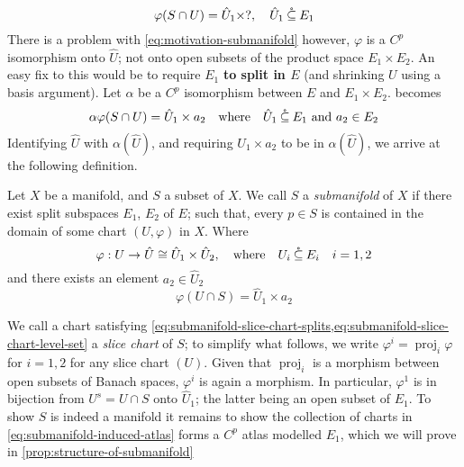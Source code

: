 \documentclass[../main-manifolds.tex]{subfiles}
\begin{document}
\begin{equation}\label{eq:motivation-submanifold}
    \varphi(S\cap U) = \hat{U}_1\times ?,\quad \hat{U}_1\:\mathring{\subseteq}\: E_1
\end{equation}
There is a problem with \cref{eq:motivation-submanifold} however, $\varphi$ is a $C^p$ isomorphism onto $\hat{U}$; not onto open subsets of the product space $E_1\times E_2$. An easy fix to this would be to require $E_1$ \textbf{to split in $E$} (and shrinking $U$ using a basis argument). Let $\alpha$ be a $C^p$ isomorphism between $E$ and $E_1\times E_2$.  becomes
\begin{equation}\label{eq:motivation-submanifold-modified}
    \alpha\varphi(S\cap U) = \hat{U}_1\times a_2\qqtext{where} \hat{U}_1\osub E_1 \text{ and }a_2\in E_2
\end{equation}
Identifying $\hat{U}$ with $\alpha(\hat{U})$, and requiring $U_1\times a_2$ to be in $\alpha(\hat{U})$, we arrive at the following definition.
\begin{definition}[Submanifold]
    Let $X$ be a manifold, and $S$ a subset of $X$. We call $S$ a \emph{submanifold} of $X$ if there exist split subspaces $E_1$, $E_2$ of $E$; such that, every $p\in S$ is contained in the domain of some chart $(U,\varphi)$ in $X$. Where
    \begin{equation}\label{eq:submanifold-slice-chart-splits}
        \varphi: U\to \hat{U}\cong \hat{U}_1\times \hat{U}_2,\qqtext{where} U_i\osub E_i\quad i=1,2
    \end{equation}
    and there exists an element $a_2\in \hat{U}_2$
    \begin{equation}\label{eq:submanifold-slice-chart-level-set}
        \varphi(U\cap S) = \hat{U}_1\times a_2
    \end{equation}
\end{definition}
We call a chart satisfying \cref{eq:submanifold-slice-chart-splits,eq:submanifold-slice-chart-level-set} a \emph{slice chart} of $S$; to simplify what follows, we write $\varphi^i = \operatorname{proj}_i\varphi$ for $i = 1,2$ for any slice chart $(U)$. Given that $\operatorname{proj}_i$ is a morphism between open subsets of Banach spaces, $\varphi^i$ is again a morphism. In particular, $\varphi^1$ is in bijection from $U^s=U\cap S$ onto $\hat{U}_1$; the latter being an open subset of $E_1$. To show $S$ is indeed a manifold it remains to show the collection of charts in \cref{eq:submanifold-induced-atlas} forms a $C^p$ atlas modelled $E_1$, which we will prove in \cref{prop:structure-of-submanifold}
\end{document}
